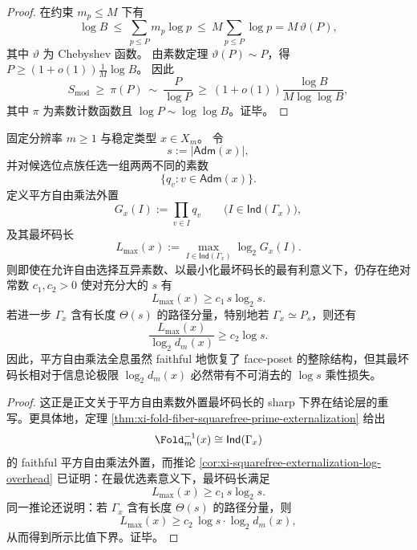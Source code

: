 \begin{proof}
在约束 \(m_p\le M\) 下有
\[
\log B
\ \le\
\sum_{p\le P}m_p\log p
\ \le\
M\sum_{p\le P}\log p
=M\,\vartheta(P),
\]
其中 \(\vartheta\) 为 Chebyshev 函数。
由素数定理 \(\vartheta(P)\sim P\)，得
\(
P\ge (1+o(1))\frac{1}{M}\log B
\)。
因此
\[
S_{\mathrm{mod}}\ \ge\ \pi(P)
\ \sim\ \frac{P}{\log P}
\ \ge\
\left(1+o(1)\right)\frac{\log B}{M\log\log B},
\]
其中 \(\pi\) 为素数计数函数且 \(\log P\sim\log\log B\)。证毕。
\end{proof}

\begin{theorem}\label{thm:conclusion-squarefree-multiplicative-holography-log-gap}
固定分辨率 \(m\ge 1\) 与稳定类型 \(x\in X_m\)。
令
\[
s:=|\mathsf{Adm}(x)|,
\]
并对候选位点族任选一组两两不同的素数
\[
\{q_v:v\in \mathsf{Adm}(x)\}.
\]
定义平方自由乘法外置
\[
G_x(I):=\prod_{v\in I}q_v
\qquad
\bigl(I\in\mathsf{Ind}(\Gamma_x)\bigr),
\]
及其最坏码长
\[
L_{\max}(x):=\max_{I\in\mathsf{Ind}(\Gamma_x)}\log_2 G_x(I).
\]
则即使在允许自由选择互异素数、以最小化最坏码长的最有利意义下，仍存在绝对常数 \(c_1,c_2>0\) 使对充分大的 \(s\) 有
\[
L_{\max}(x)\ge c_1\,s\log_2 s.
\]
若进一步 \(\Gamma_x\) 含有长度 \(\Theta(s)\) 的路径分量，特别地若 \(\Gamma_x\simeq P_s\)，则还有
\[
\frac{L_{\max}(x)}{\log_2 d_m(x)}\ge c_2\log s.
\]
因此，平方自由乘法全息虽然 faithful 地恢复了 face-poset 的整除结构，但其最坏码长相对于信息论极限 \(\log_2 d_m(x)\) 必然带有不可消去的 \(\log s\) 乘性损失。
\end{theorem}
\begin{proof}
这正是正文关于平方自由素数外置最坏码长的 sharp 下界在结论层的重写。更具体地，定理 \ref{thm:xi-fold-fiber-squarefree-prime-externalization} 给出
\[
\Fold_m^{-1}(x)\cong \mathsf{Ind}(\Gamma_x)
\]
的 faithful 平方自由乘法外置，而推论 \ref{cor:xi-squarefree-externalization-log-overhead} 已证明：在最优选素意义下，最坏码长满足
\[
L_{\max}(x)\ge c_1\,s\log_2 s.
\]
同一推论还说明：若 \(\Gamma_x\) 含有长度 \(\Theta(s)\) 的路径分量，则
\[
L_{\max}(x)\ge c_2\,\log s\cdot \log_2 d_m(x),
\]
从而得到所示比值下界。证毕。
\end{proof}

